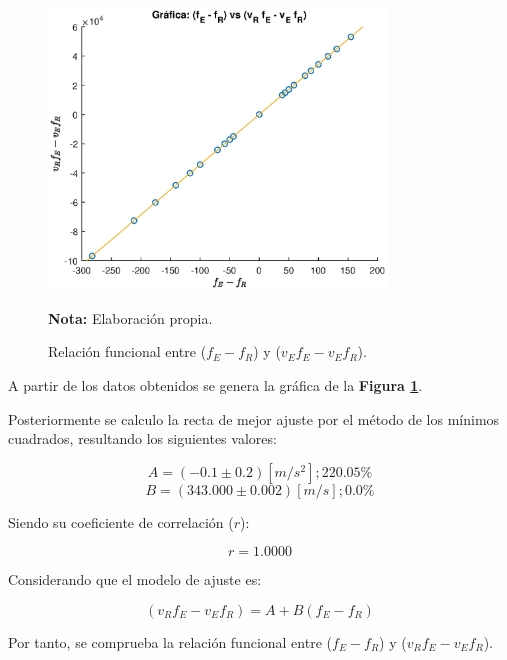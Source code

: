 \documentclass[letter,11pt]{article}
\newcommand{\source}[1]{\vspace{-11pt} \caption*{\small{\textbf{Nota:} {#1}}}}
\begin{document}
\begin{figure}
\centering
\includegraphics[width=0.80\textwidth]{resources/m3.eps}
\caption{Relación funcional entre ($f_E - f_R$) y ($v_E f_E - v_E f_R$).}
\label{figura7}
\source{Elaboración propia.}
\end{figure}

A partir de los datos obtenidos se genera la gráfica de la
\textbf{Figura \ref{figura7}}.

Posteriormente se calculo la recta de mejor ajuste por el método de los mínimos
cuadrados, resultando los siguientes valores:

\begin{equation*}
    A = (-0.1 \pm 0.2) [m/s^2]; 220.05\%
\end{equation*}
\begin{equation*}
    B = (343.000 \pm 0.002) [m/s]; 0.0\%
\end{equation*}
\vspace{0.10cm}

Siendo su coeficiente de correlación ($r$):

\begin{equation*}
    r = 1.0000
\end{equation*}
\vspace{0.10cm}

Considerando que el modelo de ajuste es:

\begin{equation*}
    (v_R f_E - v_E f_R) = A + B (f_E - f_R)
\end{equation*}
\vspace{0.10cm}

Por tanto, se comprueba la relación funcional entre ($f_E - f_R$) y
($v_R f_E - v_E f_R$).
\end{document}
